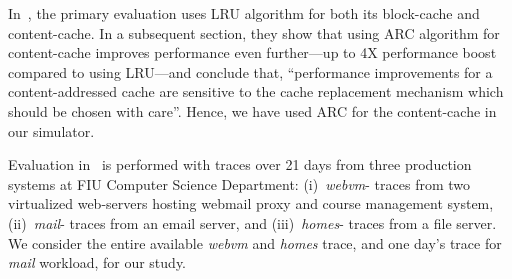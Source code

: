 In~\cite{iodedup}, the primary evaluation uses LRU algorithm for both 
its block-cache and content-cache. In a subsequent section, they show 
that using ARC algorithm for content-cache improves performance even 
further---up to 4X performance boost compared to using LRU---and conclude 
that, ``performance improvements for a content-addressed cache are 
sensitive to the cache replacement mechanism which should be chosen 
with care''. Hence, we have used ARC for the content-cache in our simulator.

Evaluation in~\cite{iodedup} is performed with 
traces over 21 days from three production systems
at FIU Computer Science Department:
(i)~\textit{webvm}- traces from two virtualized web-servers hosting webmail
proxy and course management system, (ii)~\textit{mail}- traces from an
email server, and (iii)~\textit{homes}- traces from a file server.
We consider the entire available \textit{webvm}
and \textit{homes} trace, and one day's trace for \textit{mail} workload,
for our study.


